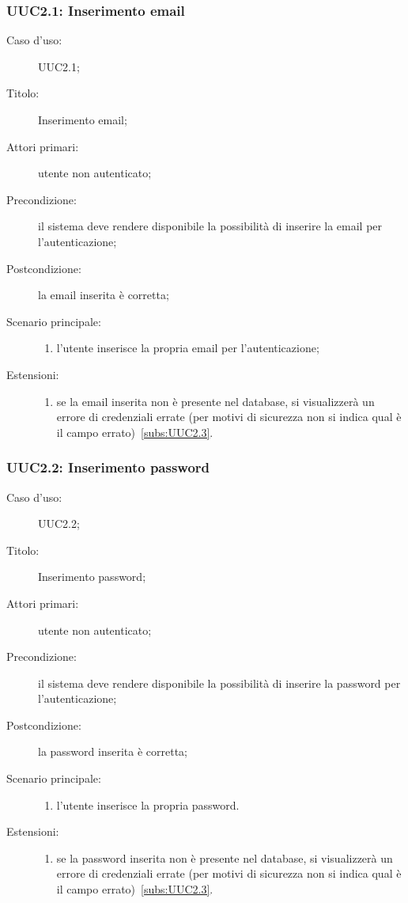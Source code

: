 \documentclass[../../../analisi-dei-requisiti.tex]{subfiles}
\begin{document}
\subsubsection{UUC2.1: Inserimento email}%
\label{subs:UUC2.1}
\begin{description}
  \item[Caso d’uso:] UUC2.1;
  \item[Titolo:] Inserimento email;
  \item[Attori primari:] utente non autenticato;
  \item[Precondizione:] il sistema deve rendere disponibile la possibilità di inserire la email per l'autenticazione;
  \item[Postcondizione:] la email inserita è corretta;
  \item[Scenario principale:]
        \begin{enumerate}
          \item l'utente inserisce la propria email per l'autenticazione;
        \end{enumerate}
  \item[Estensioni:]
        \begin{enumerate}
          \item se la email inserita non è presente nel database, si visualizzerà un errore di credenziali errate (per motivi di sicurezza non si indica qual è il campo errato)~\ref{subs:UUC2.3}.
        \end{enumerate}
\end{description}



\subsubsection{UUC2.2: Inserimento password}%
\label{subs:UUC2.2}
\begin{description}
  \item[Caso d’uso:] UUC2.2;
  \item[Titolo:] Inserimento password;
  \item[Attori primari:] utente non autenticato;
  \item[Precondizione:] il sistema deve rendere disponibile la possibilità di inserire la password per l'autenticazione;
  \item[Postcondizione:] la password inserita è corretta;
  \item[Scenario principale:]
        \begin{enumerate}
          \item l'utente inserisce la propria password.
        \end{enumerate}
  \item[Estensioni:]
        \begin{enumerate}
          \item se la password inserita non è presente nel database, si visualizzerà un errore di credenziali errate (per motivi di sicurezza non si indica qual è il campo errato)~\ref{subs:UUC2.3}.
        \end{enumerate}
\end{description}
\end{document}

